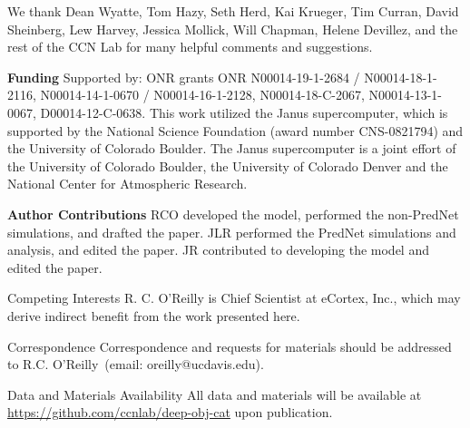 \documentclass[12pt,twoside]{naturefigs}  %
\newif\myifpdf
\begin{document}


\begin{addendum}
 \item We thank Dean Wyatte, Tom Hazy, Seth Herd, Kai Krueger, Tim Curran, David Sheinberg, Lew Harvey, Jessica Mollick, Will Chapman, Helene Devillez, and the rest of the CCN Lab for many helpful comments and suggestions.

  {\bf Funding} Supported by: ONR grants ONR N00014-19-1-2684 / N00014-18-1-2116, N00014-14-1-0670 / N00014-16-1-2128, N00014-18-C-2067, N00014-13-1-0067, D00014-12-C-0638.  This work utilized the Janus supercomputer, which is supported by the National Science Foundation (award number CNS-0821794) and the University of Colorado Boulder. The Janus supercomputer is a joint effort of the University of Colorado Boulder, the University of Colorado Denver and the National Center for Atmospheric Research.

 {\bf Author Contributions} RCO developed the model, performed the non-PredNet simulations, and drafted the paper. JLR performed the PredNet simulations and analysis, and edited the paper.  JR contributed to developing the model and edited the paper.
 \item[Competing Interests] R. C. O'Reilly is Chief Scientist at eCortex, Inc., which may derive indirect benefit from the work presented here.
 \item[Correspondence] Correspondence and requests for materials
should be addressed to R.C. O'Reilly~(email: oreilly@ucdavis.edu).
\item[Data and Materials Availability]  All data and materials will be available at \url{https://github.com/ccnlab/deep-obj-cat} upon publication.
\end{addendum}

% 
% 
% 
\end{document}
